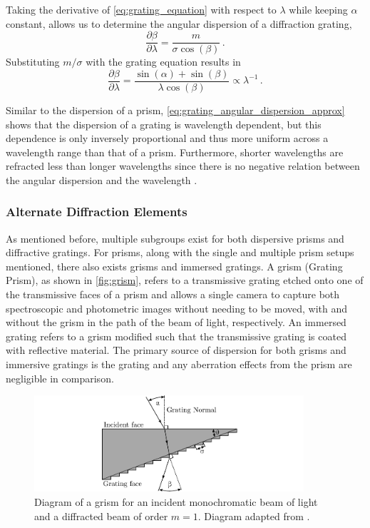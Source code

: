 Taking the derivative of \autoref{eq:grating_equation} with respect to $\lambda$ while keeping $\alpha$ constant, allows us to determine the angular dispersion of a diffraction grating,
\begin{equation}
    \frac{\partial \beta}{\partial \lambda} = \frac{m}{\sigma \cos(\beta)}\,.\label{eq:grating_angular_dispersion}
\end{equation}
Substituting $m / \sigma$ with the grating equation results in
\begin{equation}
    \frac{\partial \beta}{\partial \lambda} = \frac{\sin(\alpha) + \sin(\beta)}{\lambda \cos(\beta)} \propto \lambda^{-1}\,.\label{eq:grating_angular_dispersion_approx}
\end{equation}

Similar to the dispersion of a prism, \autoref{eq:grating_angular_dispersion_approx} shows that the dispersion of a grating is wavelength dependent, but this dependence is only inversely proportional and thus more uniform across a wavelength range than that of a prism. Furthermore, shorter wavelengths are refracted less than longer wavelengths since there is no negative relation between the angular dispersion and the wavelength \citep{BirneyObsAstro, Hecht_optics}.

\subsubsection{Alternate Diffraction Elements}

As mentioned before, multiple subgroups exist for both dispersive prisms and diffractive gratings. For prisms, along with the single and multiple prism setups mentioned, there also exists grisms and immersed gratings. A grism (Grating Prism), as shown in \autoref{fig:grism}, refers to a transmissive grating etched onto one of the transmissive faces of a prism and allows a single camera to capture both spectroscopic and photometric images without needing to be moved, with and without the grism in the path of the beam of light, respectively. An immersed grating refers to a grism modified such that the transmissive grating is coated with reflective material. The primary source of dispersion for both grisms and immersive gratings is the grating and any aberration effects from the prism are negligible in comparison.

\begin{figure}[t]
    \centering
    \includegraphics[width = 10cm]{figures/2_grism.pdf}
    \caption{Diagram of a grism for an incident monochromatic beam of light and a diffracted beam of order $m = 1$. Diagram adapted from \cite{BirneyObsAstro}.}
    \label{fig:grism}
\end{figure}

